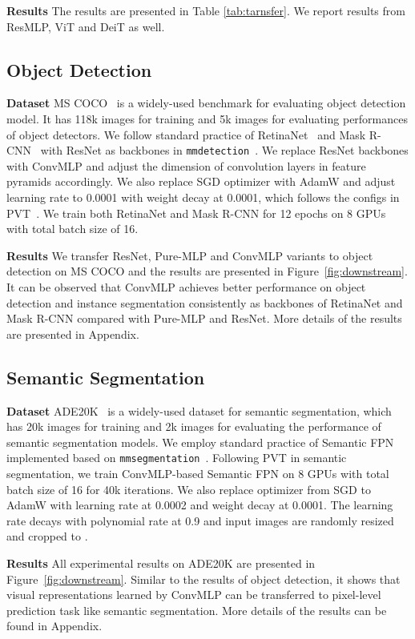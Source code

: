 \documentclass[final]{cvpr}
\begin{document}
\noindent \textbf{Results} The results are presented in Table \ref{tab:tarnsfer}. We report results from ResMLP, ViT and DeiT as well.

\subsection{Object Detection}
\noindent \textbf{Dataset} MS COCO~\cite{lin2014microsoft} is a widely-used benchmark for evaluating object detection model. It has 118k images for training and 5k images for evaluating performances of object detectors.
We follow standard practice of RetinaNet~\cite{lin2017focal} and Mask R-CNN~\cite{he2017mask} with ResNet as backbones in \verb|mmdetection|~\cite{chen2019mmdetection}. We replace ResNet backbones with ConvMLP and adjust the dimension of convolution layers in feature pyramids accordingly. We also replace SGD optimizer with AdamW and adjust learning rate to 0.0001 with weight decay at 0.0001, which follows the configs in PVT~\cite{wang2021pyramid}. We train both RetinaNet and Mask R-CNN for 12 epochs on 8 GPUs with total batch size of 16.

\noindent \textbf{Results} We transfer ResNet, Pure-MLP and ConvMLP variants to object detection on MS COCO and the results are presented in Figure~\ref{fig:downstream}. It can be observed that ConvMLP achieves better performance on object detection and instance segmentation consistently as backbones of RetinaNet and Mask R-CNN compared with Pure-MLP and ResNet. More details of the results are presented in Appendix.

\subsection{Semantic Segmentation}
\noindent \textbf{Dataset} ADE20K~\cite{zhou2017scene} is a widely-used dataset for semantic segmentation, which has 20k images for training and 2k images for evaluating the performance of semantic segmentation models. We employ standard practice of Semantic FPN~\cite{kirillov2019panoptic} implemented based on \verb|mmsegmentation|~\cite{mmseg2020}. Following PVT in semantic segmentation, we train ConvMLP-based Semantic FPN on 8 GPUs with total batch size of 16 for 40k iterations. We also replace optimizer from SGD to AdamW with learning rate at 0.0002 and weight decay at 0.0001. The learning rate decays with polynomial rate at 0.9 and input images are randomly resized and cropped to .

\noindent \textbf{Results} All experimental results on ADE20K are presented in Figure~\ref{fig:downstream}. Similar to the results of object detection, it shows that visual representations learned by ConvMLP can be transferred to pixel-level prediction task like semantic segmentation. More details of the results can be found in Appendix.
\end{document}
